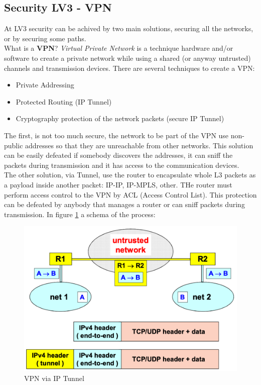 \documentclass[12pt]{article}
\begin{document}
\subsection{Security LV3 - VPN}
At LV3 security can be achived by two main solutions, securing all the networks, or by securing some paths.\\
What is a \textbf{VPN}? \textit{Virtual Private Network} is a technique hardware and/or software to create a private network while using a shared (or anyway untrusted) channels and transmission devices.
There are several techniques to create a VPN:
\begin{itemize}
  \item Private Addressing
  \item Protected Routing (IP Tunnel)
  \item Cryptography protection of the network packets (secure IP Tunnel)
\end{itemize}
The first, is not too much secure, the network to be part of the VPN use non-public addresses so that they are unreachable from other networks. This solution can be easily defeated if somebody discovers the addresses, it can sniff the packets during transmission and it has access to the communication devices.\\
The other solution, via Tunnel, use the router to encapsulate whole L3 packets as a payload inside another packet: IP-IP, IP-MPLS, other. THe router must perform access control to the VPN by ACL (Access Control List). This protection can be defeated by anybody that manages a router or can sniff packets during transmission. In figure \ref{fig:vpn_tunnel} a schema of the process:
\begin{figure}[H]
   \centering
   \includegraphics[width=\linewidth]{images/vpn_tunnel.png}
   \caption{VPN via IP Tunnel}
   \label{fig:vpn_tunnel}
\end{figure}
\end{document}
